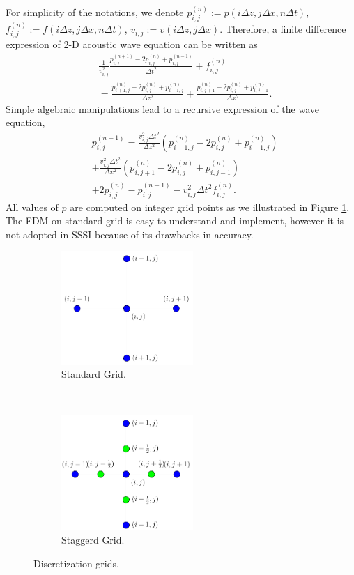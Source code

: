 \documentclass[12pt]{article}
\theoremstyle{plain}
\theoremstyle{definition}
\theoremstyle{remark}
\numberwithin{equation}{section}
\begin{document}
For simplicity of the notations, we denote $p_{i,j}^{(n)}:=  p(i\Delta z, j\Delta x, n\Delta t)$, $f_{i,j}^{(n)} := f(i\Delta z, j\Delta x, n\Delta t)$, $v_{i,j} := v(i\Delta z, j\Delta x)$.
 Therefore, a finite difference expression of 2-D acoustic wave equation can be written as 
  \begin{equation}
    \begin{aligned}
    &\frac{1}{v_{i,j}^2}\frac{p_{i,j}^{(n+1)} - 2p_{i,j}^{(n)} + p_{i,j}^{(n-1)}}{\Delta t^2} + f_{i,j}^{(n)} \\
    &= \frac{p_{i+1,j}^{(n)} - 2p_{i,j}^{(n)} + p_{i-1,j}^{(n)}}{\Delta z^2} + \frac{p_{i,j+1}^{(n)} - 2p_{i,j}^{(n)} + p_{i,j-1}^{(n)}}{\Delta x^2}.
    \end{aligned}
  \end{equation}
Simple algebraic manipulations lead to a recursive expression of the wave equation,
  \begin{equation}
    \begin{aligned}
    &p_{i,j}^{(n+1)} = \frac{v_{i,j}^2\Delta t^2}{\Delta z^2}\left(p_{i+1,j}^{(n)} - 2p_{i,j}^{(n)} + p_{i-1,j}^{(n)}\right)\\
    &+ \frac{v_{i,j}^2\Delta t^2}{\Delta x^2}\left(p_{i,j+1}^{(n)} - 2p_{i,j}^{(n)} + p_{i,j-1}^{(n)}\right)\\
    &+ 2p_{i,j}^{(n)}-p_{i,j}^{(n-1)}-v_{i,j}^2\Delta t^2 f_{i,j}^{(n)}.
    \end{aligned}
  \end{equation}
  All values of $p$ are computed on integer grid points as we illustrated in Figure \ref{fig:stanG}. The FDM on standard grid is easy to understand and implement, however it is not adopted in SSSI because of its drawbacks in accuracy.  
  
\begin{figure}
\centering
\begin{subfigure}[b]{.4\textwidth}
\includegraphics[width=5cm]{Fig/stanGrid}
\caption{Standard Grid.}
\label{fig:stanG}
\end{subfigure}
~~~~~
\begin{subfigure}[b]{0.4\textwidth}
\includegraphics[width=5cm]{Fig/StagGrid}
\caption{Staggerd Grid.}
\label{fig:stagG}
\end{subfigure}
\caption{Discretization grids.}
\end{figure}
\end{document}
